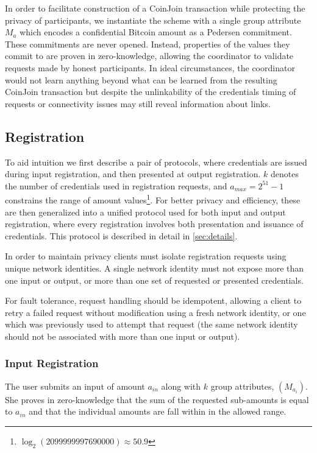 \documentclass[a4paper]{article}
\begin{document}
In order to facilitate construction of a CoinJoin transaction while protecting the privacy of participants, we instantiate the scheme with a single group attribute $M_a$ which encodes a confidential Bitcoin amount as a Pedersen commitment. These commitments are never opened. Instead, properties of the values they commit to are proven in zero-knowledge, allowing the coordinator to validate requests made by honest participants. In ideal circumstances, the coordinator would not learn anything beyond what can be learned from the resulting CoinJoin transaction but despite the unlinkability of the credentials timing of requests or connectivity issues may still reveal information about links.

\subsection{Registration}

To aid intuition we first describe a pair of protocols, where credentials are issued during input registration, and then presented at output registration. $k$ denotes the number of credentials used in registration requests, and $a_{\mathit{max}} = 2^{51}-1$ constrains the range of amount values\footnote{$\log_2(2099999997690000) \approx 50.9$}. For better privacy and efficiency, these are then generalized into a unified protocol used for both input and output registration, where every registration involves both presentation and issuance of credentials. This protocol is described in detail in \cref{sec:details}.

In order to maintain privacy clients must isolate registration requests using unique network identities. A single network identity must not expose more than one input or output, or more than one set of requested or presented credentials.

For fault tolerance, request handling should be idempotent, allowing a client to retry a failed request without modification using a fresh network identity, or one which was previously used to attempt that request (the same network identity should not be associated with more than one input or output).

\subsubsection{Input Registration}

The user submits an input of amount $a_{\mathit{in}}$ along with $k$ group attributes, $(M_{a_i})$.
She proves in zero-knowledge that the sum of the requested sub-amounts is equal to $a_{\mathit{in}}$ and that the individual amounts are fall within in the allowed range.
\end{document}
